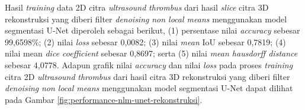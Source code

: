 \begin{enumerate}
	
	Hasil \textit{training} data 2D citra \textit{ultrasound} \textit{thrombus} dari hasil \textit{slice} citra 3D rekonstruksi yang diberi filter \textit{denoising} \textit{non local means} menggunakan model segmentasi U-Net diperoleh sebagai berikut, (1) persentase nilai \textit{accuracy} sebesar 99,6598\%; (2) nilai \textit{loss} sebesar 0,0082; (3) nilai \textit{mean} IoU sebesar 0,7819; (4) nilai mean \textit{dice coefficient} sebesar 0,8697; serta (5) nilai \textit{mean hausdorff distance} sebesar 4,0778. Adapun grafik nilai \textit{accuracy} dan nilai \textit{loss} pada proses \textit{training} citra 2D \textit{ultrasound} \textit{thrombus} dari hasil citra 3D rekonstruksi yang diberi filter \textit{denoising} \textit{non local means} menggunakan model segmentasi U-Net dapat dilihat pada Gambar \ref{fig:performance-nlm-unet-rekonstruksi}.
	

\end{enumerate}
